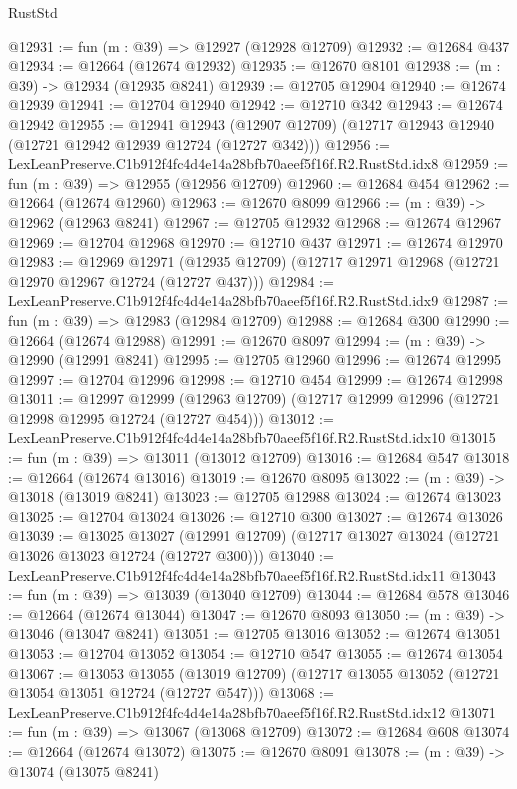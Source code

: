 \begin{lexlean}{RustStd}
\begin{coremodule}
@12931 := fun (m : @39) => @12927 (@12928 @12709)
@12932 := @12684 @437
@12934 := @12664 (@12674 @12932)
@12935 := @12670 @8101
@12938 := (m : @39) -> @12934 (@12935 @8241)
@12939 := @12705 @12904
@12940 := @12674 @12939
@12941 := @12704 @12940
@12942 := @12710 @342
@12943 := @12674 @12942
@12955 := @12941
    @12943
    (@12907 @12709)
    (@12717 @12943 @12940 (@12721 @12942 @12939 @12724 (@12727 @342)))
@12956 := LexLeanPreserve.C1b912f4fc4d4e14a28bfb70aeef5f16f.R2.RustStd.idx8
@12959 := fun (m : @39) => @12955 (@12956 @12709)
@12960 := @12684 @454
@12962 := @12664 (@12674 @12960)
@12963 := @12670 @8099
@12966 := (m : @39) -> @12962 (@12963 @8241)
@12967 := @12705 @12932
@12968 := @12674 @12967
@12969 := @12704 @12968
@12970 := @12710 @437
@12971 := @12674 @12970
@12983 := @12969
    @12971
    (@12935 @12709)
    (@12717 @12971 @12968 (@12721 @12970 @12967 @12724 (@12727 @437)))
@12984 := LexLeanPreserve.C1b912f4fc4d4e14a28bfb70aeef5f16f.R2.RustStd.idx9
@12987 := fun (m : @39) => @12983 (@12984 @12709)
@12988 := @12684 @300
@12990 := @12664 (@12674 @12988)
@12991 := @12670 @8097
@12994 := (m : @39) -> @12990 (@12991 @8241)
@12995 := @12705 @12960
@12996 := @12674 @12995
@12997 := @12704 @12996
@12998 := @12710 @454
@12999 := @12674 @12998
@13011 := @12997
    @12999
    (@12963 @12709)
    (@12717 @12999 @12996 (@12721 @12998 @12995 @12724 (@12727 @454)))
@13012 := LexLeanPreserve.C1b912f4fc4d4e14a28bfb70aeef5f16f.R2.RustStd.idx10
@13015 := fun (m : @39) => @13011 (@13012 @12709)
@13016 := @12684 @547
@13018 := @12664 (@12674 @13016)
@13019 := @12670 @8095
@13022 := (m : @39) -> @13018 (@13019 @8241)
@13023 := @12705 @12988
@13024 := @12674 @13023
@13025 := @12704 @13024
@13026 := @12710 @300
@13027 := @12674 @13026
@13039 := @13025
    @13027
    (@12991 @12709)
    (@12717 @13027 @13024 (@12721 @13026 @13023 @12724 (@12727 @300)))
@13040 := LexLeanPreserve.C1b912f4fc4d4e14a28bfb70aeef5f16f.R2.RustStd.idx11
@13043 := fun (m : @39) => @13039 (@13040 @12709)
@13044 := @12684 @578
@13046 := @12664 (@12674 @13044)
@13047 := @12670 @8093
@13050 := (m : @39) -> @13046 (@13047 @8241)
@13051 := @12705 @13016
@13052 := @12674 @13051
@13053 := @12704 @13052
@13054 := @12710 @547
@13055 := @12674 @13054
@13067 := @13053
    @13055
    (@13019 @12709)
    (@12717 @13055 @13052 (@12721 @13054 @13051 @12724 (@12727 @547)))
@13068 := LexLeanPreserve.C1b912f4fc4d4e14a28bfb70aeef5f16f.R2.RustStd.idx12
@13071 := fun (m : @39) => @13067 (@13068 @12709)
@13072 := @12684 @608
@13074 := @12664 (@12674 @13072)
@13075 := @12670 @8091
@13078 := (m : @39) -> @13074 (@13075 @8241)

\end{coremodule}
\end{lexlean}
